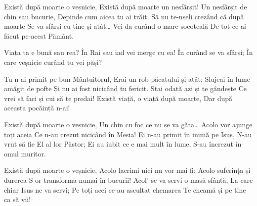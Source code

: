 \beginverse
Există după moarte o veșnicie,
Există după moarte un nesfârșit!
Un nesfârșit de chin sau bucurie,
Depinde cum aicea tu ai trăit.
Să nu te-nșeli crezând că după moarte
Se va sfârși cu tine și atât…
Vei da curând o mare socoteală
De tot ce-ai făcut pe-acest Pământ.
\endverse

\beginchorus
Viața ta e bună sau rea?
În Rai sau iad vei merge cu ea!
În curând se va sfârși;
În care veșnicie curând tu vei păși?
\endchorus

\beginverse
Tu n-ai primit pe bun Mântuitorul,
Erai un rob păcatului și-atât;
Slujeai în lume amăgit de pofte
Și nu ai fost nicicând tu fericit.
Stai odată azi și te gândește
Ce vrei să faci și cui să te predai!
Există viață, o viață după moarte,
Dar după aceasta pocăință n-ai!
\endverse

\beginverse
Există după moarte o veșnicie,
Un chin cu foc ce nu se va găta…
Acolo vor ajunge toți aceia
Ce n-au crezut nicicând în Mesia!
Ei n-au primit în inimă pe Isus,
N-au vrut să fie El al lor Păstor;
Ei au iubit ce e mai mult în lume,
S-au încrezut în omul muritor.
\endverse

\beginverse
Există după moarte o veșnicie,
Acolo lacrimi nici nu vor mai fi;
Acolo suferința și durerea
S-or transforma numai în bucurii!
Acol’ se va servi o masă sfântă,
La care chiar Isus ne va servi;
Pe toți acei ce-au ascultat chemarea
Te cheamă și pe tine ca să vii!
\endverse
\endsong
